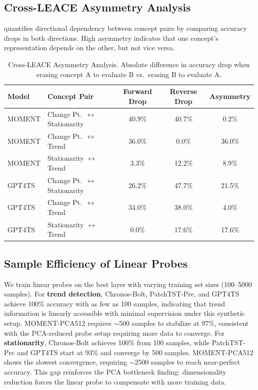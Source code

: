 \documentclass{article}
\begin{document}
\subsection{Cross-LEACE Asymmetry Analysis}

 quantifies directional dependency between concept pairs by comparing accuracy drops in both directions. High asymmetry indicates that one concept's representation depends on the other, but not vice versa.

\begin{table}[tbp]
\caption{Cross-LEACE Asymmetry Analysis. Absolute difference in accuracy drop when erasing concept A to evaluate B vs.\ erasing B to evaluate A.}
\label{tab:cross_leace_asymmetry}
\centering
\begin{tabular}{llccc}
\toprule
Model & Concept Pair & Forward Drop & Reverse Drop & Asymmetry \\
\midrule
MOMENT & Change Pt.\ $\leftrightarrow$ Stationarity & 40.9\% & 40.7\% & 0.2\% \\
MOMENT & Change Pt.\ $\leftrightarrow$ Trend & 36.0\% & 0.0\% & 36.0\% \\
MOMENT & Stationarity $\leftrightarrow$ Trend & 3.3\% & 12.2\% & 8.9\% \\
\midrule
GPT4TS & Change Pt.\ $\leftrightarrow$ Stationarity & 26.2\% & 47.7\% & 21.5\% \\
GPT4TS & Change Pt.\ $\leftrightarrow$ Trend & 34.0\% & 38.0\% & 4.0\% \\
GPT4TS & Stationarity $\leftrightarrow$ Trend & 0.0\% & 17.6\% & 17.6\% \\
\bottomrule
\end{tabular}
\end{table}

\subsection{Sample Efficiency of Linear Probes}

We train linear probes on the best layer with varying training set sizes (100--5000 samples). For \textbf{trend detection}, Chronos-Bolt, PatchTST-Pre, and GPT4TS achieve 100\% accuracy with as few as 100 samples, indicating that trend information is linearly accessible with minimal supervision under this synthetic setup. MOMENT-PCA512 requires $\sim$500 samples to stabilize at 97\%, consistent with the PCA-reduced probe setup requiring more data to converge. For \textbf{stationarity}, Chronos-Bolt achieves 100\% from 100 samples, while PatchTST-Pre and GPT4TS start at 93\% and converge by 500 samples. MOMENT-PCA512 shows the slowest convergence, requiring $\sim$2500 samples to reach near-perfect accuracy. This gap reinforces the PCA bottleneck finding: dimensionality reduction forces the linear probe to compensate with more training data.
\end{document}
